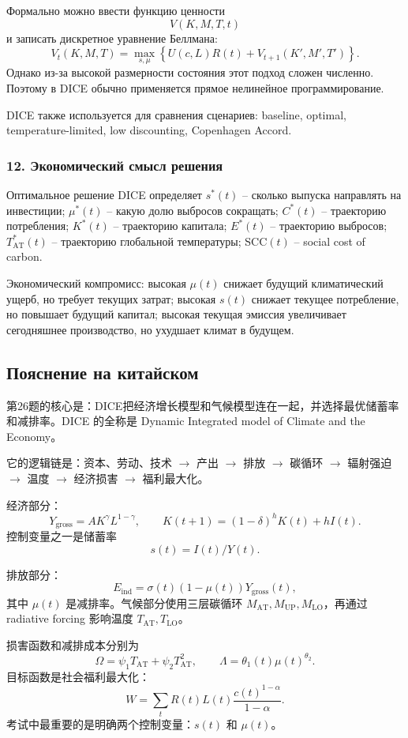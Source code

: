 \documentclass[12pt,a4paper]{article}
\begin{document}
Формально можно ввести функцию ценности
\[
V(K,M,T,t)
\]
и записать дискретное уравнение Беллмана:
\[
V_t(K,M,T)=\max_{s,\mu}\left\{U(c,L)R(t)+V_{t+1}(K',M',T')\right\}.
\]
Однако из-за высокой размерности состояния этот подход сложен численно. Поэтому в DICE обычно применяется прямое нелинейное программирование.

DICE также используется для сравнения сценариев: baseline, optimal, temperature-limited, low discounting, Copenhagen Accord.

\subsubsection*{12. Экономический смысл решения}
Оптимальное решение DICE определяет $s^*(t)$ -- сколько выпуска направлять на инвестиции; $\mu^*(t)$ -- какую долю выбросов сокращать; $C^*(t)$ -- траекторию потребления; $K^*(t)$ -- траекторию капитала; $E^*(t)$ -- траекторию выбросов; $T_{\mathrm{AT}}^*(t)$ -- траекторию глобальной температуры; SCC$(t)$ -- social cost of carbon.

Экономический компромисс: высокая $\mu(t)$ снижает будущий климатический ущерб, но требует текущих затрат; высокая $s(t)$ снижает текущее потребление, но повышает будущий капитал; высокая текущая эмиссия увеличивает сегодняшнее производство, но ухудшает климат в будущем.

\subsection{Пояснение на китайском}
第26题的核心是：DICE把经济增长模型和气候模型连在一起，并选择最优储蓄率和减排率。DICE 的全称是 Dynamic Integrated model of Climate and the Economy。

它的逻辑链是：资本、劳动、技术 $\to$ 产出 $\to$ 排放 $\to$ 碳循环 $\to$ 辐射强迫 $\to$ 温度 $\to$ 经济损害 $\to$ 福利最大化。

经济部分：
\[
Y_{\mathrm{gross}}=AK^\gamma L^{1-\gamma},
\qquad
K(t+1)=(1-\delta)^hK(t)+hI(t).
\]
控制变量之一是储蓄率
\[
s(t)=I(t)/Y(t).
\]

排放部分：
\[
E_{\mathrm{ind}}=\sigma(t)(1-\mu(t))Y_{\mathrm{gross}}(t),
\]
其中 $\mu(t)$ 是减排率。气候部分使用三层碳循环 $M_{\mathrm{AT}},M_{\mathrm{UP}},M_{\mathrm{LO}}$，再通过 radiative forcing 影响温度 $T_{\mathrm{AT}},T_{\mathrm{LO}}$。

损害函数和减排成本分别为
\[
\Omega=\psi_1T_{\mathrm{AT}}+\psi_2T_{\mathrm{AT}}^2,
\qquad
\Lambda=\theta_1(t)\mu(t)^{\theta_2}.
\]
目标函数是社会福利最大化：
\[
W=\sum_t R(t)L(t)\frac{c(t)^{1-\alpha}}{1-\alpha}.
\]
考试中最重要的是明确两个控制变量：$s(t)$ 和 $\mu(t)$。
\end{document}
